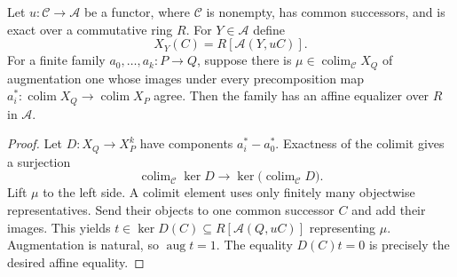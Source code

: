 \begin{lemma}
\label{A:exact-cover-averaging}
Let $u:\mathcal C\to\mathcal A$ be a functor, where $\mathcal C$ is
nonempty, has common successors, and is exact over a commutative ring $R$.
For $Y\in\mathcal A$ define
\[
 X_Y(C)=R[\mathcal A(Y,uC)].
\]
For a finite family $a_0,\ldots,a_k:P\to Q$, suppose there is
$\mu\in\operatorname{colim}_{\mathcal C}X_Q$ of augmentation one
whose images under every precomposition map
$a_i^*:\operatorname{colim}X_Q\to\operatorname{colim}X_P$ agree.
Then the family has an affine equalizer over $R$ in $\mathcal A$.
\end{lemma}
\begin{proof}
Let $D:X_Q\to X_P^k$ have components $a_i^*-a_0^*$.
Exactness of the colimit gives a surjection
\[
 \operatorname{colim}_{\mathcal C}\ker D
       \longrightarrow
 \ker\bigl(\operatorname{colim}_{\mathcal C}D\bigr).
\]
Lift $\mu$ to the left side.  A colimit element uses only finitely
many objectwise representatives.  Send their objects to one common
successor $C$ and add their images.  This yields
$t\in\ker D(C)\subseteq R[\mathcal A(Q,uC)]$ representing $\mu$.
Augmentation is natural, so $\operatorname{aug}t=1$.
The equality $D(C)t=0$ is precisely the desired affine equality.
\end{proof}

